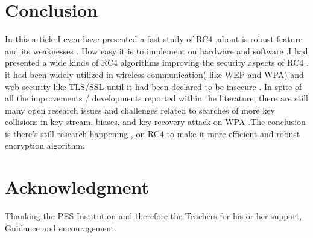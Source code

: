 \documentclass[conference]{IEEEtran}
\begin{document}
\section*{Conclusion}
In this article I even have presented a fast study of RC4
,about is robust feature and its weaknesses . How easy
it is to implement on hardware and software .I had
presented a wide kinds of RC4 algorithms improving the
security aspects of RC4 . it had been widely utilized in wireless
communication( like WEP and WPA) and web security like
TLS/SSL until it had been declared to be insecure . \newline
In spite of all the improvements / developments reported within the literature, there
are still many open research issues and challenges  related
to searches of more  key collisions in key stream, biases, and
key recovery attack on WPA .The conclusion is there's still
research happening , on RC4 to make it more efficient and
robust encryption algorithm.\newline \newline 
\section*{Acknowledgment}
Thanking the PES Institution and therefore the Teachers for his or her
support, Guidance and encouragement. \newline \newline 
\end{document}
